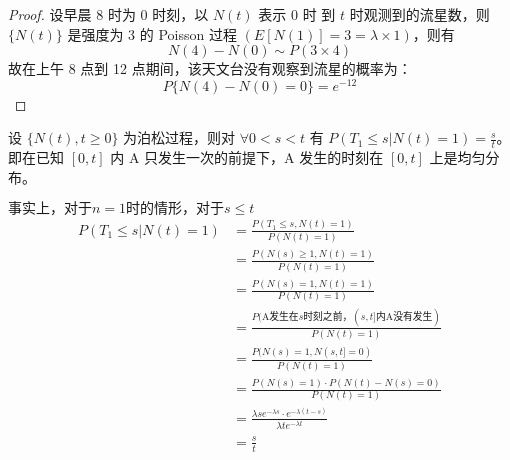 \documentclass[lang=cn,10pt,thmcnt=section]{elegantbook}
\begin{document}
\begin{proof}
	设早晨 8 时为 0 时刻，以 $N(t)$ 表示 0 时 到 $t$ 时观测到的流星数，则 $\{N(t)\}$ 是强度为 3 的 Poisson 过程 $(E[N(1)] = 3 = \lambda \times 1)$，则有
\[
N(4) - N(0) \sim P(3 \times 4)
\]
故在上午 8 点到 12 点期间，该天文台没有观察到流星的概率为：
\[
P\{N(4) - N(0) = 0\} = e^{-12}
\]
\end{proof}
\begin{theorem}
	设 $\{N(t), t \geq 0\}$ 为泊松过程，则对 $\forall 0 < s < t$ 有 $P(T_1 \leq s | N(t) = 1) = \frac{s}{t}$。即在已知 $[0,t]$ 内 A 只发生一次的前提下，A 发生的时刻在 $[0,t]$ 上是均匀分布。
\end{theorem}
$\text{事实上，对于} n = 1 \text{时的情形，对于} s \leq t$
\begin{align*}
P(T_1 \leq s | N(t) = 1) &= \frac{P(T_1 \leq s, N(t) = 1)}{P(N(t) = 1)} \\
&= \frac{P(N(s) \geq 1, N(t) = 1)}{P(N(t) = 1)} \\
&= \frac{P(N(s) = 1, N(t) = 1)}{P(N(t) = 1)} \\
&= \frac{P(\text{A发生在} s \text{时刻之前，} (s,t] \text{内A没有发生})}{P(N(t) = 1)} \\
&= \frac{P(N(s) = 1, N(s,t] = 0)}{P(N(t) = 1)} \\
&= \frac{P(N(s) = 1) \cdot P(N(t) - N(s) = 0)}{P(N(t) = 1)} \\
&= \frac{\lambda s e^{-\lambda s} \cdot e^{-\lambda(t-s)}}{\lambda t e^{-\lambda t}} \\
&= \frac{s}{t}
\end{align*}
\end{document}
